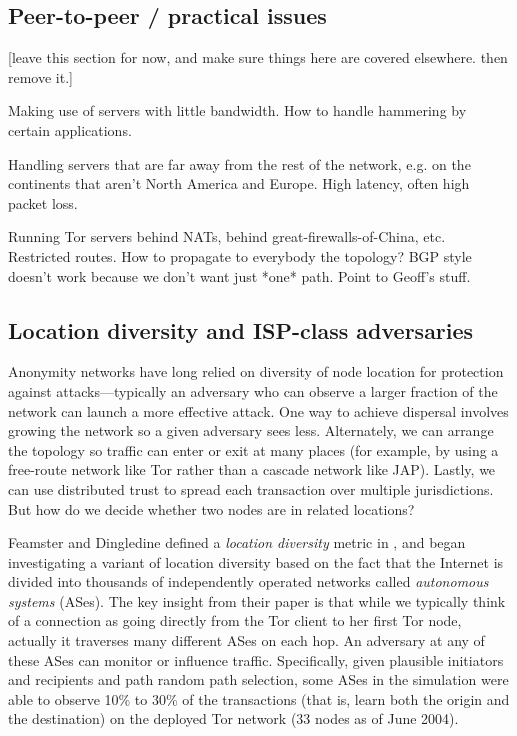 \documentclass{llncs}
\begin{document}
\subsection{Peer-to-peer / practical issues}

[leave this section for now, and make sure things here are covered
elsewhere. then remove it.]

Making use of servers with little bandwidth. How to handle hammering by
certain applications.

Handling servers that are far away from the rest of the network, e.g. on
the continents that aren't North America and Europe. High latency,
often high packet loss.

Running Tor servers behind NATs, behind great-firewalls-of-China, etc.
Restricted routes. How to propagate to everybody the topology? BGP
style doesn't work because we don't want just *one* path. Point to
Geoff's stuff.

\subsection{Location diversity and ISP-class adversaries}
\label{subsec:routing-zones}

Anonymity networks have long relied on diversity of node location for
protection against attacks---typically an adversary who can observe a
larger fraction of the network can launch a more effective attack. One
way to achieve dispersal involves growing the network so a given adversary
sees less. Alternately, we can arrange the topology so traffic can enter
or exit at many places (for example, by using a free-route network
like Tor rather than a cascade network like JAP). Lastly, we can use
distributed trust to spread each transaction over multiple jurisdictions.
But how do we decide whether two nodes are in related locations?

Feamster and Dingledine defined a \emph{location diversity} metric
in \cite{feamster:wpes2004}, and began investigating a variant of location
diversity based on the fact that the Internet is divided into thousands of
independently operated networks called {\em autonomous systems} (ASes).
The key insight from their paper is that while we typically think of a
connection as going directly from the Tor client to her first Tor node,
actually it traverses many different ASes on each hop. An adversary at
any of these ASes can monitor or influence traffic. Specifically, given
plausible initiators and recipients and path random path selection,
some ASes in the simulation were able to observe 10\% to 30\% of the
transactions (that is, learn both the origin and the destination) on
the deployed Tor network (33 nodes as of June 2004).
\end{document}
